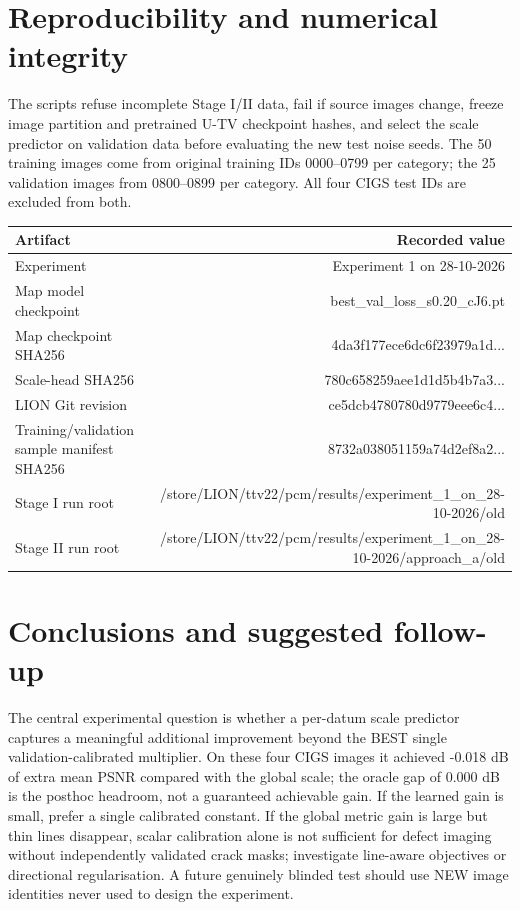 \documentclass[11pt,a4paper]{article}
\begin{document}
\section{Reproducibility and numerical integrity}

The scripts refuse incomplete Stage I/II data, fail if source images change, freeze image partition and pretrained U-TV checkpoint hashes, and select the scale predictor on validation data before evaluating the new test noise seeds. The 50 training images come from original training IDs 0000--0799 per category; the 25 validation images from 0800--0899 per category. All four CIGS test IDs are excluded from both.

\begin{center}
\small
\begin{tabular}{lr}
\toprule
Artifact & Recorded value\\
\midrule
Experiment & Experiment 1 on 28-10-2026\\
Map model checkpoint & best\_val\_loss\_s0.20\_cJ6.pt\\
Map checkpoint SHA256 & 4da3f177ece6dc6f23979a1d...\\
Scale-head SHA256 & 780c658259aee1d1d5b4b7a3...\\
LION Git revision & ce5dcb4780780d9779eee6c4...\\
Training/validation sample manifest SHA256 & 8732a038051159a74d2ef8a2...\\
Stage I run root & /store/LION/ttv22/pcm/results/experiment\_1\_on\_28-10-2026/old\\
Stage II run root & /store/LION/ttv22/pcm/results/experiment\_1\_on\_28-10-2026/approach\_a/old\\
\bottomrule
\end{tabular}
\end{center}

\section{Conclusions and suggested follow-up}

The central experimental question is whether a per-datum scale predictor captures a meaningful additional improvement beyond the BEST single validation-calibrated multiplier. On these four CIGS images it achieved -0.018 dB of extra mean PSNR compared with the global scale; the oracle gap of 0.000 dB is the posthoc headroom, not a guaranteed achievable gain. If the learned gain is small, prefer a single calibrated constant. If the global metric gain is large but thin lines disappear, scalar calibration alone is not sufficient for defect imaging without independently validated crack masks; investigate line-aware objectives or directional regularisation. A future genuinely blinded test should use NEW image identities never used to design the experiment.
\end{document}
